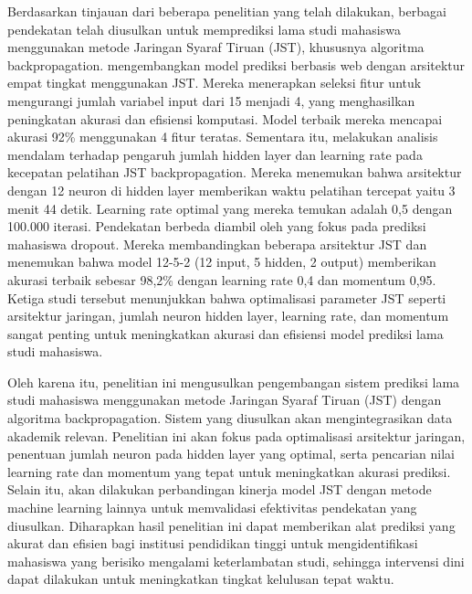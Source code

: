 Berdasarkan tinjauan dari beberapa penelitian yang telah dilakukan, berbagai pendekatan telah diusulkan untuk memprediksi lama studi mahasiswa menggunakan metode Jaringan Syaraf Tiruan (JST), khususnya algoritma backpropagation. \cite{hossen2021web} mengembangkan model prediksi berbasis web dengan arsitektur empat tingkat menggunakan JST. Mereka menerapkan seleksi fitur untuk mengurangi jumlah variabel input dari 15 menjadi 4, yang menghasilkan peningkatan akurasi dan efisiensi komputasi. Model terbaik mereka mencapai akurasi 92\% menggunakan 4 fitur teratas. Sementara itu, \cite{sunardi2022pengaruh} melakukan analisis mendalam terhadap pengaruh jumlah hidden layer dan learning rate pada kecepatan pelatihan JST backpropagation. Mereka menemukan bahwa arsitektur dengan 12 neuron di hidden layer memberikan waktu pelatihan tercepat yaitu 3 menit 44 detik. Learning rate optimal yang mereka temukan adalah 0,5 dengan 100.000 iterasi. Pendekatan berbeda diambil oleh \cite{sari2021analisis} yang fokus pada prediksi mahasiswa dropout. Mereka membandingkan beberapa arsitektur JST dan menemukan bahwa model 12-5-2 (12 input, 5 hidden, 2 output) memberikan akurasi terbaik sebesar 98,2\% dengan learning rate 0,4 dan momentum 0,95. Ketiga studi tersebut menunjukkan bahwa optimalisasi parameter JST seperti arsitektur jaringan, jumlah neuron hidden layer, learning rate, dan momentum sangat penting untuk meningkatkan akurasi dan efisiensi model prediksi lama studi mahasiswa.

Oleh karena itu, penelitian ini mengusulkan pengembangan sistem prediksi lama studi mahasiswa menggunakan metode Jaringan Syaraf Tiruan (JST) dengan algoritma backpropagation. Sistem yang diusulkan akan mengintegrasikan data akademik relevan. Penelitian ini akan fokus pada optimalisasi arsitektur jaringan, penentuan jumlah neuron pada hidden layer yang optimal, serta pencarian nilai learning rate dan momentum yang tepat untuk meningkatkan akurasi prediksi. Selain itu, akan dilakukan perbandingan kinerja model JST dengan metode machine learning lainnya untuk memvalidasi efektivitas pendekatan yang diusulkan. Diharapkan hasil penelitian ini dapat memberikan alat prediksi yang akurat dan efisien bagi institusi pendidikan tinggi untuk mengidentifikasi mahasiswa yang berisiko mengalami keterlambatan studi, sehingga intervensi dini dapat dilakukan untuk meningkatkan tingkat kelulusan tepat waktu.


